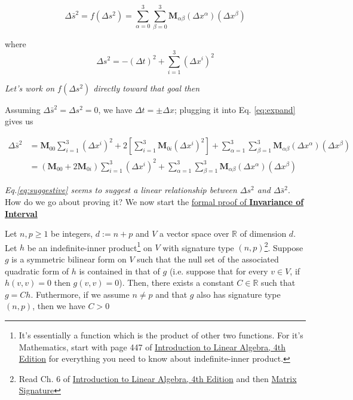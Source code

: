 \begin{tcolorbox}
    \[
        \Delta \bar{s}^2 = f\left( \Delta s^2 \right) = \sum_{\alpha = 0}^3\sum_{\beta = 0}^3 \boldsymbol{M}_{\alpha\beta}\left(\Delta x^{\alpha}\right)\left(\Delta x^{\beta}\right)
    \]

    where \[ \Delta s^2 = -(\Delta t)^2 + \sum_{i = 1}^3 (\Delta x^i)^2 \]

    \begin{center}
        \textit{Let's work on $f\left( \Delta s^2 \right)$ directly toward that goal then}
    \end{center}
\end{tcolorbox}

Assuming $\Delta \bar{s}^2 = \Delta s^2 = 0$, we have $\Delta t = \pm\Delta x$; plugging it into Eq. \ref{eq:expand} gives us

\begin{align}
    \Delta\bar{s}^2 &= \boldsymbol{M}_{00}\sum_{i = 1}^3\left( \Delta x^i \right)^2 + 2\left[ \sum_{i = 1}^3\boldsymbol{M}_{0i}\left( \Delta x^i \right)^2 \right] + \sum_{\alpha = 1}^3\sum_{\beta = 1}^3 \boldsymbol{M}_{\alpha\beta}\left(\Delta x^{\alpha}\right)\left(\Delta x^{\beta}\right) \\
    &= \left( \boldsymbol{M}_{00} + 2\boldsymbol{M}_{0i} \right)\sum_{i = 1}^3\left( \Delta x^i \right)^2 + \sum_{\alpha = 1}^3\sum_{\beta = 1}^3 \boldsymbol{M}_{\alpha\beta}\left(\Delta x^{\alpha}\right)\left(\Delta x^{\beta}\right) \label{eq:suggestive}
\end{align}

\textit{Eq.\ref{eq:suggestive} seems to suggest a linear relationship between $\Delta s^2$ and $\Delta\bar{s}^2$}. How do we go about proving it? We now start the \href{https://en.wikipedia.org/wiki/Derivations\_of\_the\_Lorentz\_transformations#Rigorous\_Statement\_and\_Proof\_of\_Proportionality_of_ds2_and_ds\%E2\%80\%B22}{formal proof of \textbf{Invariance of Interval}}

\begin{mytheorem}{}{}
    Let $n, p \ge 1$ be integers, $d := n + p$ and $V$ a vector space over $\mathbb{R}$ of dimension $d$. Let $h$ be
    an indefinite-inner product\footnote{It's essentially a function which is the product of other two functions. For it's Mathematics, start with page 447 of \href{https://trello.com/c/qHJeDNkU}{Introduction to Linear Algebra, 4th Edition} for everything you need to know about indefinite-inner product.} on $V$ with signature type $(n, p)$\footnote{Read Ch. 6 of \href{https://trello.com/c/qHJeDNkU}{Introduction to Linear Algebra, 4th Edition} and then \href{https://mathworld.wolfram.com/MatrixSignature.html}{Matrix Signature}}. Suppose $g$ is a symmetric bilinear form on $V$
    such that the null set of the associated quadratic form of $h$ is contained in that of $g$ (i.e. suppose that for
    every $v \in V$, if $h(v, v) = 0$ then $g(v, v) = 0$). Then, there exists a constant $C \in \mathbb{R}$ such that
    $g = Ch$. Futhermore, if we assume $n \ne p$ and that $g$ also has signature type $(n, p)$, then we have $C > 0$
\end{mytheorem}

